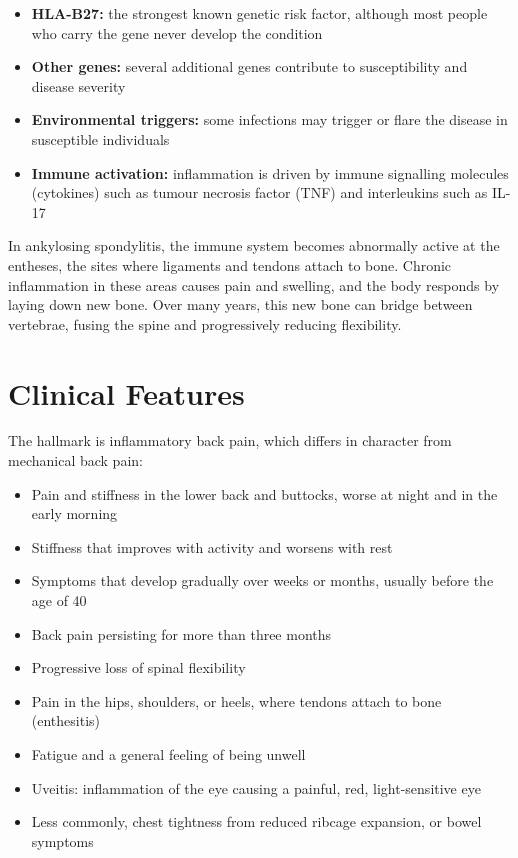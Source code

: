 \begin{itemize}
    \item \textbf{HLA-B27:} the strongest known genetic risk factor, although most people who carry the gene never develop the condition
    \item \textbf{Other genes:} several additional genes contribute to susceptibility and disease severity
    \item \textbf{Environmental triggers:} some infections may trigger or flare the disease in susceptible individuals
    \item \textbf{Immune activation:} inflammation is driven by immune signalling molecules (cytokines) such as tumour necrosis factor (TNF) and interleukins such as IL-17
\end{itemize}

In ankylosing spondylitis, the immune system becomes abnormally active at the entheses, the sites where ligaments and tendons attach to bone. Chronic inflammation in these areas causes pain and swelling, and the body responds by laying down new bone. Over many years, this new bone can bridge between vertebrae, fusing the spine and progressively reducing flexibility.

\section*{Clinical Features}
The hallmark is inflammatory back pain, which differs in character from mechanical back pain:

\begin{itemize}
    \item Pain and stiffness in the lower back and buttocks, worse at night and in the early morning
    \item Stiffness that improves with activity and worsens with rest
    \item Symptoms that develop gradually over weeks or months, usually before the age of 40
    \item Back pain persisting for more than three months
    \item Progressive loss of spinal flexibility
    \item Pain in the hips, shoulders, or heels, where tendons attach to bone (enthesitis)
    \item Fatigue and a general feeling of being unwell
    \item Uveitis: inflammation of the eye causing a painful, red, light-sensitive eye
    \item Less commonly, chest tightness from reduced ribcage expansion, or bowel symptoms
\end{itemize}

